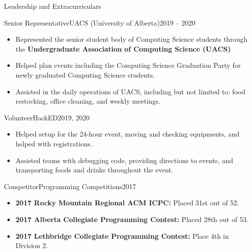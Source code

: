 \documentclass[]{mcdowellcv}
\begin{document}
\vspace*{-10pt}
\begin{cvsection}{Leadership and Extracurriculars}{}{}
  \begin{cvsubsection}{Senior Representative}{UACS (University of Alberta)}{2019 -- 2020}
    \begin{itemize}
      \item Represented the senior student body of Computing Science students through the \textbf{Undergraduate Association of Computing Science (UACS)}
      \item Helped plan events including the Computing Science Graduation Party for newly graduated Computing Science students.
      \item Assisted in the daily operations of UACS, including but not limited to: food restocking, office cleaning, and weekly meetings.        
    \end{itemize}
  \end{cvsubsection}

  \begin{cvsubsection}{Volunteer}{HackED}{2019, 2020}
    \begin{itemize}
      \item Helped setup for the 24-hour event, moving and checking equipments, and helped with registrations.
      \item Assisted teams with debugging code, providing directions to events, and transporting foods and drinks throughout the event.    
    \end{itemize}
  \end{cvsubsection}
  
  \begin{cvsubsection}{Competitor}{Programming Competitions}{2017}
    \begin{itemize}
      \item \textbf{2017 Rocky Mountain Regional ACM ICPC:} Placed 31st out of 52.
      \item \textbf{2017 Alberta Collegiate Programming Contest:} Placed 28th out of 53.
      \item \textbf{2017 Lethbridge Collegiate Programming Contest:} Place 4th in Division 2.
    \end{itemize}
  \end{cvsubsection}
\end{cvsection}
\end{document}
